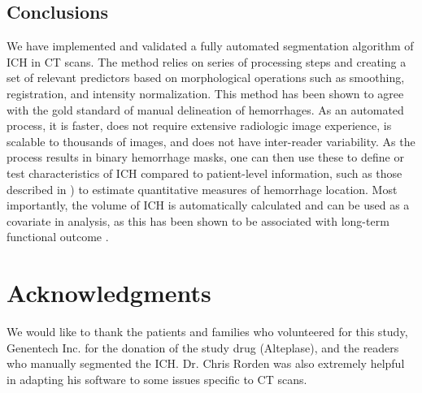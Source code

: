 

\subsection{Conclusions}
We have implemented and validated a fully automated segmentation algorithm of ICH in CT scans.  The method relies on series of processing steps and  creating a set of relevant predictors based on morphological operations such as smoothing, registration, and intensity normalization.  This method has been shown to agree with the gold standard of manual delineation of hemorrhages.  As an automated process, it is faster, does not require extensive radiologic image experience, is scalable to thousands of images, and does not have inter-reader variability.  As the process results in binary hemorrhage masks, one can then use these to define or test characteristics of ICH compared to patient-level information, such as those described in \citet{muschelli2015quantitative}) to estimate quantitative measures of hemorrhage location.  Most importantly, the volume of ICH is automatically calculated and can be used as a covariate in analysis, as this has been shown to be associated with long-term functional outcome \citep{broderick_volume_1993, jordan2009intracerebral, tuhrim_volume_1999}.  


\section*{Acknowledgments}
We would like to thank the patients and families who volunteered for this study, Genentech Inc. for the donation of the study drug (Alteplase), and the readers who manually segmented the ICH.  Dr. Chris Rorden was also extremely helpful in adapting his  software to some issues specific to CT scans.

